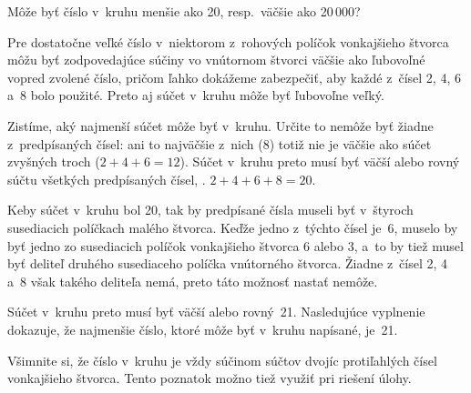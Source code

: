{%
\napad
Môže byť číslo v~kruhu menšie ako 20, resp.\ väčšie ako 20\,000?

\riesenie
Pre dostatočne veľké číslo v~niektorom z~rohových políčok vonkajšieho štvorca môžu byť zodpovedajúce súčiny vo vnútornom štvorci väčšie ako ľubovoľné vopred zvolené číslo, pričom ľahko dokážeme zabezpečiť, aby každé z~čísel 2, 4, 6 a~8 bolo použité.
Preto aj súčet v~kruhu môže byť ľubovoľne veľký.

\smallskip
Zistíme, aký najmenší súčet môže byť v~kruhu.
Určite to nemôže byť žiadne z~predpísaných čísel: ani to najväčšie z~nich (8) totiž nie je väčšie ako súčet zvyšných troch ($2+4+6=12$).
Súčet v~kruhu preto musí byť väčší alebo rovný súčtu všetkých predpísaných čísel, \tj. $2+4+6+8=20$.

Keby súčet v~kruhu bol 20, tak by predpísané čísla museli byť v~štyroch susediacich políčkach malého štvorca.
Keďže jedno z~týchto čísel je~6, muselo by byť jedno zo susediacich políčok vonkajšieho štvorca 6 alebo 3, a~to by tiež musel byť deliteľ druhého susediaceho políčka vnútorného štvorca.
Žiadne z~čísel 2, 4 a~8 však takého deliteľa nemá, preto táto možnosť nastať nemôže.

Súčet v~kruhu preto musí byť väčší alebo rovný~21.
Nasledujúce vyplnenie dokazuje, že najmenšie číslo, ktoré môže byť v~kruhu napísané, je~21.
%



\poznamka
Všimnite si, že číslo v~kruhu je vždy súčinom súčtov dvojíc protiľahlých čísel vonkajšieho štvorca.
Tento poznatok možno tiež využiť pri riešení úlohy.
}

